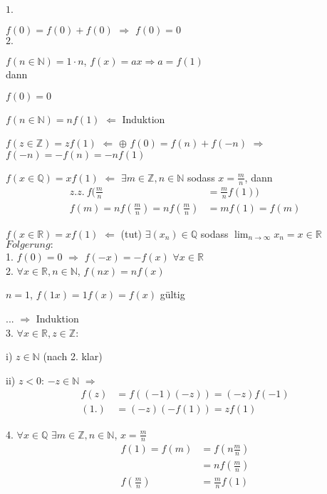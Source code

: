 $1.$

$f(0)=f(0)+f(0)$ $\Rightarrow$ $f(0)=0$\\

$2.$

$f(n\in\mathbb{N})=1\cdot n$, $f(x)=ax\Rightarrow a=f(1)$\\

dann

$f(0)=0$

$f(n\in\mathbb{N})=nf(1)$ $\Leftarrow$ Induktion

$f(z\in\mathbb{Z})=zf(1)$ $\Leftarrow$ $\oplus$ $f(0)=f(n)+f(-n)$ $\Rightarrow$ $f(-n)=-f(n)=-nf(1)$

$f(x\in\mathbb{Q})=xf(1)$ $\Leftarrow$ $\exists m\in\mathbb{Z},n\in\mathbb{N}$ sodass $x=\frac{m}{n}$, dann
\begin{align*}
z.z.\ f(\frac{m}{n}&=\frac{m}{n}f(1))\\
f(m)=nf(\frac{m}{n})=nf(\frac{m}{n})&=mf(1)=f(m)
\end{align*}

$f(x\in\mathbb{R})=xf(1)$ $\Leftarrow$ (tut) $\exists(x_n)\in\mathbb{Q}$ sodass $\lim_{n\rightarrow\infty}x_n=x\in\mathbb{R}$\\

$Folgerung:$\\

1. $f(0)=0$ $\Rightarrow$ $f(-x)=-f(x)$ $\forall x\in\mathbb{R}$\\

2. $\forall x\in\mathbb{R},n\in\mathbb{N}$, $f(nx)=nf(x)$

$n=1$, $f(1x)=1f(x)=f(x)$ gültig

... $\Rightarrow$ Induktion\\

3. $\forall x\in\mathbb{R},z\in\mathbb{Z}$:

i) $z\in\mathbb{N}$ (nach 2. klar)

ii) $z<0$: $-z\in\mathbb{N}$ $\Rightarrow$
\begin{align*}
f(z)&=f((-1)(-z))=(-z)f(-1)\\
(1.)&=(-z)(-f(1))=zf(1)
\end{align*}

4. $\forall x\in\mathbb{Q}$ $\exists m\in\mathbb{Z},n\in\mathbb{N}$, $x=\frac{m}{n}$
\begin{align*}
f(1)=f(m)&=f(n\frac{m}{n})\\
&=nf(\frac{m}{n})\\
f(\frac{m}{n})&=\frac{m}{n}f(1)
\end{align*}

